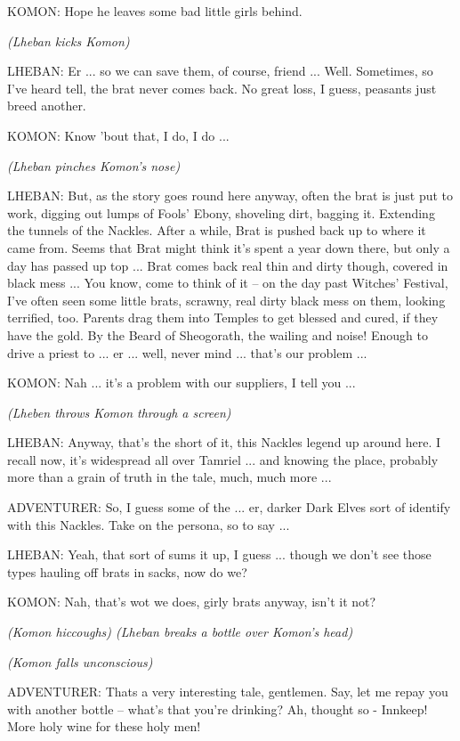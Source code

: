 KOMON: Hope he leaves some bad little girls behind.

\textit{(Lheban kicks Komon)}

LHEBAN: Er ... so we can save them, of course, friend ... Well. Sometimes, so I've heard tell, the brat never comes back. No great loss, I guess, peasants just breed another.

KOMON: Know 'bout that, I do, I do ...

\textit{(Lheban pinches Komon's nose)}

LHEBAN: But, as the story goes round here anyway, often the brat is just put to work, digging out lumps of Fools' Ebony, shoveling dirt, bagging it. Extending the tunnels of the Nackles. After a while, Brat is pushed back up to where it came from. Seems that Brat might think it's spent a year down there, but only a day has passed up top ... Brat comes back real thin and dirty though, covered in black mess ... You know, come to think of it -- on the day past Witches' Festival, I've often seen some little brats, scrawny, real dirty black mess on them, looking terrified, too. Parents drag them into Temples to get blessed and cured, if they have the gold. By the Beard of Sheogorath, the wailing and noise! Enough to drive a priest to ... er ... well, never mind ... that's our problem ...

KOMON: Nah ... it's a problem with our suppliers, I tell you ...

\textit{(Lheben throws Komon through a screen)}

LHEBAN: Anyway, that's the short of it, this Nackles legend up around here. I recall now, it's widespread all over Tamriel ... and knowing the place, probably more than a grain of truth in the tale, much, much more ...

ADVENTURER: So, I guess some of the ... er, darker Dark Elves sort of identify with this Nackles. Take on the persona, so to say ...

LHEBAN: Yeah, that sort of sums it up, I guess ... though we don't see those types hauling off brats in sacks, now do we?

KOMON: Nah, that's wot we does, girly brats anyway, isn't it not?

\textit{(Komon hiccoughs) (Lheban breaks a bottle over Komon's head)}

\textit{(Komon falls unconscious)}

ADVENTURER: Thats a very interesting tale, gentlemen. Say, let me repay you with another bottle -- what's that you're drinking? Ah, thought so - Innkeep! More holy wine for these holy men!

